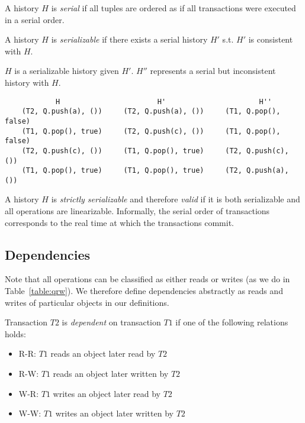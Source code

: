 \begin{defn}
    A history $H$ is \emph{serial} if all tuples are ordered as if all transactions were executed in a serial order.
\end{defn}
\begin{defn}
    A history $H$ is \emph{serializable} if there exists a serial history $H'$ s.t. $H'$ is consistent with $H$.

\end{defn}

\begin{eg}
$H$ is a serializable history given $H'$. $H''$ represents a serial but inconsistent history with $H$.
\begin{lstlisting}
            H                       H'                      H'' 
    (T2, Q.push(a), ())     (T2, Q.push(a), ())     (T1, Q.pop(), false)
    (T1, Q.pop(), true)     (T2, Q.push(c), ())     (T1, Q.pop(), false)
    (T2, Q.push(c), ())     (T1, Q.pop(), true)     (T2, Q.push(c), ())
    (T1, Q.pop(), true)     (T1, Q.pop(), true)     (T2, Q.push(a), ()) 
\end{lstlisting}
\end{eg}

\begin{defn}
    A history $H$ is \emph{strictly serializable} and therefore \emph{valid} if it is both serializable and all operations are linearizable. Informally, the serial order of transactions corresponds to the real time at which the transactions commit.
\end{defn}

\subsection{Dependencies}

Note that all operations can be classified as either reads or writes (as we do in Table~\ref{table:qrw}). We therefore define dependencies abstractly as reads and writes of particular objects in our definitions.

\begin{defn}
    Transaction $T2$ is \emph{dependent} on transaction $T1$ if one of the following relations holds:
    \begin{itemize}
        \item R-R: $T1$ reads an object later read by $T2$
        \item R-W: $T1$ reads an object later written by $T2$
        \item W-R: $T1$ writes an object later read by $T2$
        \item W-W: $T1$ writes an object later written by $T2$
    \end{itemize}
\end{defn}

